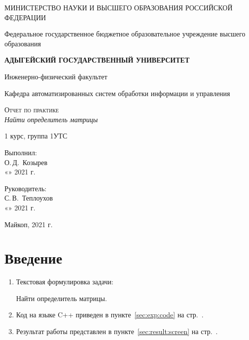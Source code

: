 \documentclass[12pt,a4paper]{scrartcl}
\begin{document}
	\begin{titlepage}
		\begin{center}
			\large
			МИНИСТЕРСТВО НАУКИ И ВЫСШЕГО ОБРАЗОВАНИЯ РОССИЙСКОЙ ФЕДЕРАЦИИ
			
			Федеральное государственное бюджетное образовательное учреждение высшего образования
			
			\textbf{АДЫГЕЙСКИЙ ГОСУДАРСТВЕННЫЙ УНИВЕРСИТЕТ}
			\vspace{0.25cm}
			
			Инженерно-физический факультет
			
			Кафедра автоматизированных систем обработки информации и управления
			\vfill

			\vfill
			
			\textsc{Отчет по практике}\\[5mm]
			
			{\LARGE \textit{Найти определитель матрицы}}
			\bigskip
			
			1 курс, группа 1УТС
		\end{center}
		\vfill
		
		\newlength{\ML}
		\hfill\begin{minipage}{0.5\textwidth}
			Выполнил:\\
			\underline{\hspace{\ML}} О.\,Д.~Козырев\\
			«\underline{\hspace{0.7cm}}» \underline{\hspace{2cm}} 2021 г.
		\end{minipage}%
		\bigskip
		
		\hfill\begin{minipage}{0.5\textwidth}
			Руководитель:\\
			\underline{\hspace{\ML}} С.\,В.~Теплоухов\\
			«\underline{\hspace{0.7cm}}» \underline{\hspace{2cm}} 2021 г.
		\end{minipage}%
		\vfill
		
		\begin{center}
			Майкоп, 2021 г.
		\end{center}
	\end{titlepage}
		
	\section{Введение}
	\label{sec:intro}
	\begin{enumerate}
	\item Текстовая формулировка задачи:
	
	Найти определитель матрицы.
	\item Код на языке C++ приведен в пункте~\ref{sec:exp:code} на стр.~\pageref{sec:exp:code}.
	\item Результат работы представлен в пункте~\ref{sec:result:screen} на стр.~\pageref{figure:screen}.
	\end{enumerate}
	
\end{document}
